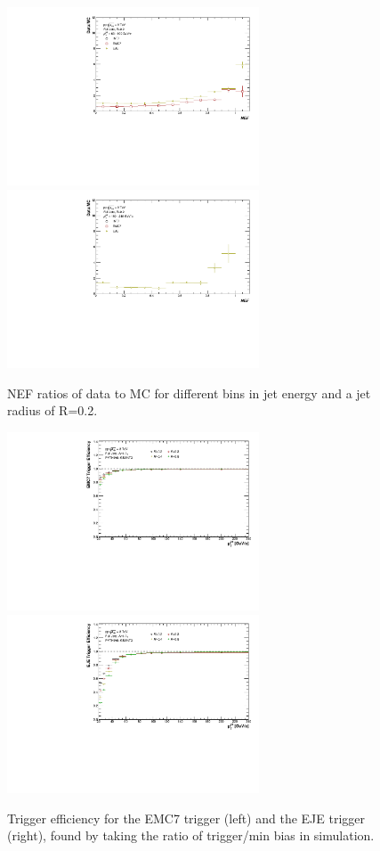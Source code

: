 \documentclass[ALICE]{ALICE_analysis_notes}
\begin{document}
\begin{figure}[h!]
\begin{multicols}{2}
            \includegraphics[width=7.5cm]{figures/TriggerBias/NEF/hNEF_ptBin3_R02.pdf}
            \includegraphics[width=7.5cm]{figures/TriggerBias/NEF/hNEF_ptBin5_R02.pdf}
        \vfill\null
    \end{multicols}
    \caption{NEF ratios of data to MC for different bins in jet energy and a jet radius of R=0.2.}
    \label{fig:TriggerBiasNEFR02}
\end{figure}

\begin{figure}[h!]
    \centering
    \begin{multicols}{2}
            \includegraphics[width=7.5cm]{figures/TriggerEfficiency/hEfficiency_EMC7.pdf}
        \vfill\null
        \columnbreak
            \includegraphics[width=7.5cm]{figures/TriggerEfficiency/hEfficiency_EJE.pdf}
        \vfill\null
    \end{multicols}
    \caption{Trigger efficiency for the EMC7 trigger (left) and the EJE trigger (right), found by taking the ratio of trigger/min bias in simulation.}
    \label{fig:TriggerEfficiency}
\end{figure}
\end{document}
